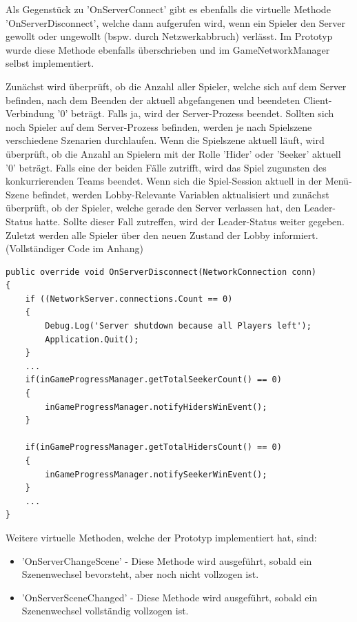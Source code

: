 Als Gegenstück zu 'OnServerConnect' gibt es ebenfalls die virtuelle Methode 'OnServerDisconnect', welche dann aufgerufen wird, wenn ein Spieler den Server gewollt oder ungewollt (bspw. durch Netzwerkabbruch) verlässt. Im Prototyp wurde diese Methode ebenfalls überschrieben und im GameNetworkManager selbst implementiert. 

Zunächst wird überprüft, ob die Anzahl aller Spieler, welche sich auf dem Server befinden, nach dem Beenden der aktuell abgefangenen und beendeten Client-Verbindung '0' beträgt. Falls ja, wird der Server-Prozess beendet. Sollten sich noch Spieler auf dem Server-Prozess befinden, werden je nach Spielszene verschiedene Szenarien durchlaufen. Wenn die Spielszene aktuell läuft, wird überprüft, ob die Anzahl an Spielern mit der Rolle 'Hider' oder 'Seeker' aktuell '0' beträgt. Falls eine der beiden Fälle zutrifft, wird das Spiel zugunsten des konkurrierenden Teams beendet. Wenn sich die Spiel-Session aktuell in der Menü-Szene befindet, werden Lobby-Relevante Variablen aktualisiert und zunächst überprüft, ob der Spieler, welche gerade den Server verlassen hat, den Leader-Status hatte. Sollte dieser Fall zutreffen, wird der Leader-Status weiter gegeben. Zuletzt werden alle Spieler über den neuen Zustand der Lobby informiert. (Vollständiger Code im Anhang)

\begin{lstlisting}[caption= GameNetworkManager.cs OnServerDisconnect()]
public override void OnServerDisconnect(NetworkConnection conn)
{
	if ((NetworkServer.connections.Count == 0)
	{
		Debug.Log('Server shutdown because all Players left');
		Application.Quit();
	}
	...
	if(inGameProgressManager.getTotalSeekerCount() == 0)
	{
		inGameProgressManager.notifyHidersWinEvent();
	}

	if(inGameProgressManager.getTotalHidersCount() == 0)
	{
		inGameProgressManager.notifySeekerWinEvent();
	}
	...
}
\end{lstlisting}

Weitere virtuelle Methoden, welche der Prototyp implementiert hat, sind:

\begin{itemize}
	\item 'OnServerChangeScene' - Diese Methode wird ausgeführt, sobald ein Szenenwechsel bevorsteht, aber noch nicht vollzogen ist.
	\item 'OnServerSceneChanged' - Diese Methode wird ausgeführt, sobald ein Szenenwechsel vollständig vollzogen ist.
\end{itemize}

